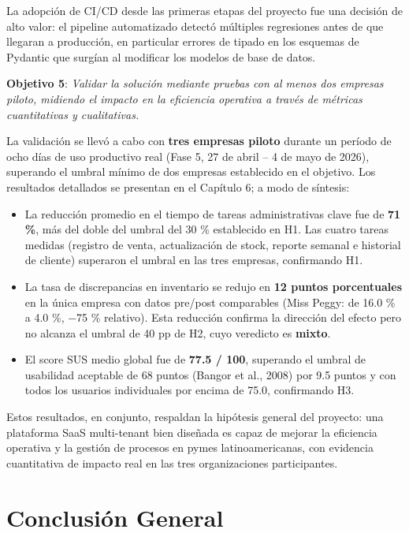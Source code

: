 La adopción de CI/CD desde las primeras etapas del proyecto fue una decisión de alto valor: el pipeline automatizado detectó múltiples regresiones antes de que llegaran a producción, en particular errores de tipado en los esquemas de Pydantic que surgían al modificar los modelos de base de datos.

\textbf{Objetivo 5}: \emph{Validar la solución mediante pruebas con al menos dos empresas piloto, midiendo el impacto en la eficiencia operativa a través de métricas cuantitativas y cualitativas.}

La validación se llevó a cabo con \textbf{tres empresas piloto} durante un período de ocho días de uso productivo real (Fase 5, 27 de abril -- 4 de mayo de 2026), superando el umbral mínimo de dos empresas establecido en el objetivo. Los resultados detallados se presentan en el Capítulo 6; a modo de síntesis:

\begin{itemize}
\tightlist
\item
  La reducción promedio en el tiempo de tareas administrativas clave fue de \textbf{71 \%}, más del doble del umbral del 30 \% establecido en H1. Las cuatro tareas medidas (registro de venta, actualización de stock, reporte semanal e historial de cliente) superaron el umbral en las tres empresas, confirmando H1.
\item
  La tasa de discrepancias en inventario se redujo en \textbf{12 puntos porcentuales} en la única empresa con datos pre/post comparables (Miss Peggy: de 16.0 \% a 4.0 \%, −75 \% relativo). Esta reducción confirma la dirección del efecto pero no alcanza el umbral de 40 pp de H2, cuyo veredicto es \textbf{mixto}.
\item
  El score SUS medio global fue de \textbf{77.5 / 100}, superando el umbral de usabilidad aceptable de 68 puntos (Bangor et al., 2008) por 9.5 puntos y con todos los usuarios individuales por encima de 75.0, confirmando H3.
\end{itemize}

Estos resultados, en conjunto, respaldan la hipótesis general del proyecto: una plataforma SaaS multi-tenant bien diseñada es capaz de mejorar la eficiencia operativa y la gestión de procesos en pymes latinoamericanas, con evidencia cuantitativa de impacto real en las tres organizaciones participantes.

\section{Conclusión General}\label{conclusiuxf3n-general}

